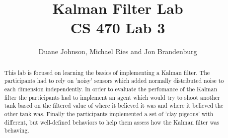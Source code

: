 \documentclass[letterpaper,12pt]{report}
\begin{document}
\title{Kalman Filter Lab \\
{\large \textbf{CS 470 Lab 3}}}
\author{Duane Johnson, Michael Ries and Jon Brandenburg}
\maketitle
\begin{abstract}
This lab is focused on learning the basics of implementing a Kalman filter.  The participants
had to rely on 'noisy' sensors which added normally distributed noise to each dimension independently.
In order to evaluate the perfomance of the Kalman filter the participants had to implement an agent which would try to shoot
another tank based on the filtered value of where it believed it was and where it believed the other tank was.
Finally the participants implemented a set of 'clay pigeons' with different, but well-defined behaviors to help them
assess how the Kalman filter was behaving.
\end{abstract}
\tableofcontents



%
\appendix

%
%
%
%
\end{document}
